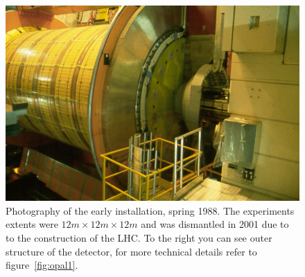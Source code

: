 \begin{figure}[htpb]
    \centering
    \includegraphics[width=1.0\linewidth]{figures/opal_photo}
    \caption{Photography of the early installation, spring 1988\cite{CERN_OPAL}. The experiments extents were
    $12m \times 12m \times 12m$ and was dismantled in 2001 due to to the construction of the LHC. To the right you can 
see outer structure of the detector, for more technical details refer to figure~\ref{fig:opal1}. }
    \label{fig:opal_photo}
\end{figure}

